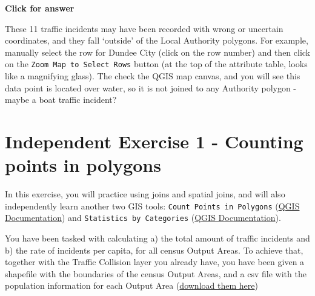 \documentclass[
  letterpaper,
  DIV=11,
  numbers=noendperiod]{scrreprt}
\begin{document}
\begin{tcolorbox}[enhanced jigsaw, toprule=.15mm, breakable, left=2mm, colframe=quarto-callout-important-color-frame, colback=white, arc=.35mm, leftrule=.75mm, opacityback=0, rightrule=.15mm, bottomrule=.15mm]

\vspace{-3mm}\textbf{Click for answer}\vspace{3mm}

These 11 traffic incidents may have been recorded with wrong or
uncertain coordinates, and they fall `outside' of the Local Authority
polygons. For example, manually select the row for Dundee City (click on
the row number) and then click on the
\texttt{Zoom\ Map\ to\ Select\ Rows} button (at the top of the attribute
table, looks like a magnifying glass). The check the QGIS map canvas,
and you will see this data point is located over water, so it is not
joined to any Authority polygon - maybe a boat traffic incident?

\end{tcolorbox}

\section{Independent Exercise 1 - Counting points in
polygons}\label{independent-exercise-1---counting-points-in-polygons}

In this exercise, you will practice using joins and spatial joins, and
will also independently learn another two GIS tools:
\texttt{Count\ Points\ in\ Polygons}
(\href{https://docs.qgis.org/3.34/en/docs/user_manual/processing_algs/qgis/vectoranalysis.html\#count-points-in-polygon}{QGIS
Documentation}) and \texttt{Statistics\ by\ Categories}
(\href{https://docs.qgis.org/3.34/en/docs/user_manual/processing_algs/qgis/vectoranalysis.html\#qgisstatisticsbycategories}{QGIS
Documentation}).

You have been tasked with calculating a) the total amount of traffic
incidents and b) the rate of incidents per capita, for all census Output
Areas. To achieve that, together with the Traffic Collision layer you
already have, you have been given a shapefile with the boundaries of the
census Output Areas, and a csv file with the population information for
each Output Area
(\href{https://stir-my.sharepoint.com/:u:/g/personal/ala2_stir_ac_uk/EbDVBY1vzPFFmXze9NnPAXMB_5agSBMugN0pEkmlDoBo1w?e=FcK74N}{download
them here})
\end{document}
